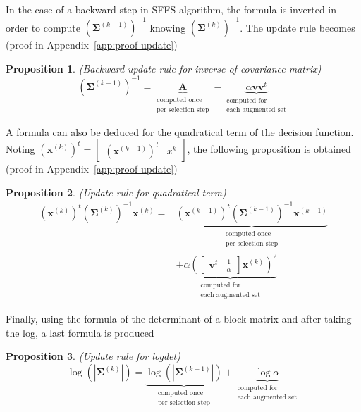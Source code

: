 \documentclass[journal,peerreview,onecolumn]{IEEEtran}
\newtheorem{prop}{Proposition}
\begin{document}
        In the case of a backward step in SFFS algorithm, the formula is inverted in order to compute $(\boldsymbol{\Sigma}^{(k-1)})^{-1}$ knowing $(\boldsymbol{\Sigma}^{(k)})^{-1}$. The update rule becomes (proof in Appendix~\ref{app:proof-update})
        \begin{prop}
        \label{eq:update-inv-back}
            (Backward update rule for inverse of covariance matrix)
            \begin{equation*}
                (\boldsymbol{\Sigma}^{(k-1)})^{-1} = \underbrace{\mathbf{A}}_{\substack{\text{computed once}\\ \text{per selection step}}} - \underbrace{\alpha \mathbf{v} \mathbf{v}^t}_{\substack{\text{computed for} \\ \text{each augmented set}}}
            \end{equation*}
        \end{prop}

        A formula can also be deduced for the quadratical term of the decision function. Noting $(\mathbf{x}^{(k)})^t = \left[\begin{array}{cc} (\mathbf{x}^{(k-1)})^t   & x^k \end{array}\right]$, the following proposition is obtained (proof in Appendix~\ref{app:proof-update})
        \begin{prop}
        \label{eq:update-quad}
            (Update rule for quadratical term)
            \begin{align*}
                (\mathbf{x}^{(k)})^t (\boldsymbol{\Sigma}^{(k)})^{-1} \mathbf{x}^{(k)} = &\underbrace{(\mathbf{x}^{(k-1)})^t (\boldsymbol{\Sigma}^{(k-1)})^{-1} \mathbf{x}^{(k-1)}}_{\substack{\text{computed once}\\ \text{per selection step}}} \\
                &+ \underbrace{\alpha ( \left[\begin{array}{cc} \mathbf{v}^t & \frac{1}{\alpha} \end{array}\right] \mathbf{x}^{(k)} )^2}_{\substack{\text{computed for} \\ \text{each augmented set}}}
            \end{align*}
        \end{prop}

        Finally, using the formula of the determinant of a block matrix and after taking the log, a last formula is produced
        \begin{prop}
        \label{eq:update-log}
            (Update rule for logdet)
            \begin{equation*}
                \log \left(|\boldsymbol{\Sigma}^{(k)}|\right) = \underbrace{\log \left(|\boldsymbol{\Sigma}^{(k-1)}|\right)}_{\substack{\text{computed once}\\ \text{per selection step}}} + \underbrace{\log \alpha}_{\substack{\text{computed for} \\ \text{each augmented set}}}
            \end{equation*}
        \end{prop}
\end{document}
